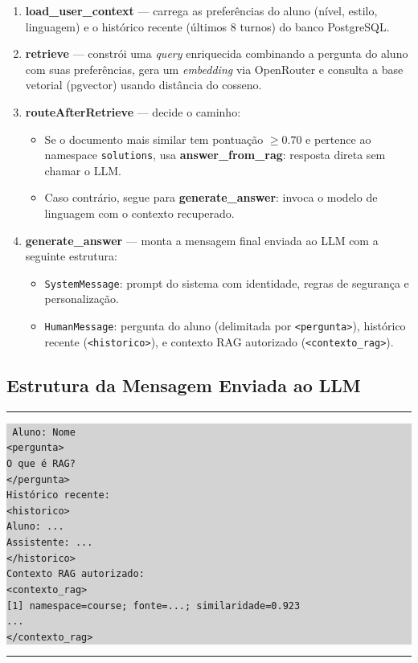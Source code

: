 \documentclass[11pt,a4paper]{article}
\newcommand{\boxedinfo}[1]{%
  \vspace{0.8em}\noindent
  {\color{primary!20}\rule{\textwidth}{0.5pt}}\par\nopagebreak
  \vspace{0.3em}\noindent\colorbox{lightgray}{%
    \parbox{\dimexpr\textwidth-2\fboxsep\relax}{%
      \vspace{0.4em}\hspace{0.5em}#1\hspace{0.5em}\vspace{0.4em}%
    }%
  }\par\nopagebreak
  \vspace{0.3em}\noindent
  {\color{primary!20}\rule{\textwidth}{0.5pt}}\vspace{0.8em}%
}
\begin{document}
\begin{enumerate}[leftmargin=1.5em, itemsep=0.3em]
  \item \textbf{load\_user\_context} — carrega as preferências do aluno (nível, estilo, linguagem) e o histórico recente (últimos 8 turnos) do banco PostgreSQL.
  \item \textbf{retrieve} — constrói uma \textit{query} enriquecida combinando a pergunta do aluno com suas preferências, gera um \textit{embedding} via OpenRouter e consulta a base vetorial (pgvector) usando distância do cosseno.
  \item \textbf{routeAfterRetrieve} — decide o caminho:
    \begin{itemize}
      \item Se o documento mais similar tem pontuação $\ge 0.70$ e pertence ao namespace \texttt{solutions}, usa \textbf{answer\_from\_rag}: resposta direta sem chamar o LLM.
      \item Caso contrário, segue para \textbf{generate\_answer}: invoca o modelo de linguagem com o contexto recuperado.
    \end{itemize}
  \item \textbf{generate\_answer} — monta a mensagem final enviada ao LLM com a seguinte estrutura:
    \begin{itemize}
      \item \texttt{SystemMessage}: prompt do sistema com identidade, regras de segurança e personalização.
      \item \texttt{HumanMessage}: pergunta do aluno (delimitada por \texttt{<pergunta>}), histórico recente (\texttt{<historico>}), e contexto RAG autorizado (\texttt{<contexto\_rag>}).
    \end{itemize}
\end{enumerate}

\subsection{Estrutura da Mensagem Enviada ao LLM}

\boxedinfo{%
\texttt{%
Aluno: Nome\\[2pt]
\textless pergunta\textgreater\\
O que é RAG?\\
\textless /pergunta\textgreater\\[2pt]
Histórico recente:\\
\textless historico\textgreater\\
Aluno: ...\\
Assistente: ...\\
\textless /historico\textgreater\\[2pt]
Contexto RAG autorizado:\\
\textless contexto\_rag\textgreater\\
{[}1{]} namespace=course; fonte=...; similaridade=0.923\\
...\\
\textless /contexto\_rag\textgreater%
}}
\end{document}
